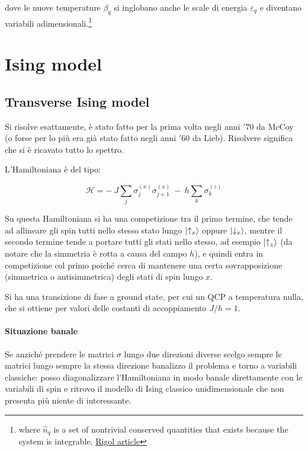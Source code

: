\documentclass[a4paper,10pt]{article}
\begin{document}
\noindent dove le nuove temperature $\beta_q$ si inglobano anche le scale di energia $\varepsilon_q$ e diventano variabili adimensionali.\footnote{where $\hat{n}_q$	is  a  set  of  nontrivial  conserved  quantities  that  exists because  the  system  is integrable, \href{https://arxiv.org/pdf/1604.03990.pdf}{Rigol article}}

\section{Ising model}

\subsection{Transverse Ising model} Si risolve esattamente, è stato fatto per la prima volta negli anni $'70$ da McCoy (o forse per lo più era già stato fatto negli anni $'60$ da Lieb). Risolvere significa che si è ricavato tutto lo spettro.

L'Hamiltoniana è del tipo:

\begin{equation}
\mathcal{H} = -~ J \sum_j \sigma_j^{(x)} \sigma_{j+1}^{(x)} ~-~ h \sum_k \sigma_k^{(z)}
\end{equation}

Su questa Hamiltoniana si ha una competizione tra il primo termine, che tende ad allineare gli spin tutti nello stesso stato lungo $\ket{\uparrow_x}$ oppure $\ket{\downarrow_x}$, mentre il secondo termine tende a portare tutti gli stati nello stesso, ad esempio $\ket{\uparrow_z}$ (da notare che la simmetria è rotta a causa del campo $h$), e quindi entra in competizione col primo poiché cerca di mantenere una certa sovrapposizione (simmetrica o antisimmetrica) degli stati di spin lungo $x$.

Si ha una transizione di fase a ground state, per cui un QCP a temperatura nulla, che si ottiene per valori delle costanti di accoppiamento $J/h = 1$.

\paragraph{Situazione banale} Se anziché prendere le matrici $\sigma$ lungo due direzioni diverse scelgo sempre le matrici lungo sempre la stessa direzione banalizzo il problema e torno a variabili classiche: posso diagonalizzare l'Hamiltoniana in modo banale direttamente con le variabili di spin e ritrovo il modello di Ising classico unidimensionale che non presenta più niente di interessante.
\end{document}

